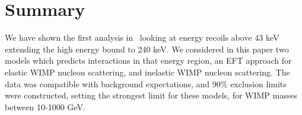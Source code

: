 \section{Summary}
We have shown the first analysis in \Xehund\ looking at energy recoils above 43 keV extending the high energy bound to 240 keV. We considered in this paper two models which predicts interactions in that energy region, an EFT approach for elastic WIMP nucleon scattering, and inelastic WIMP nucleon scattering. The data was compatible with background expectations, and 90\% exclusion limits were constructed, setting the strongest limit for these models, for WIMP masses between 10-1000 GeV.  
